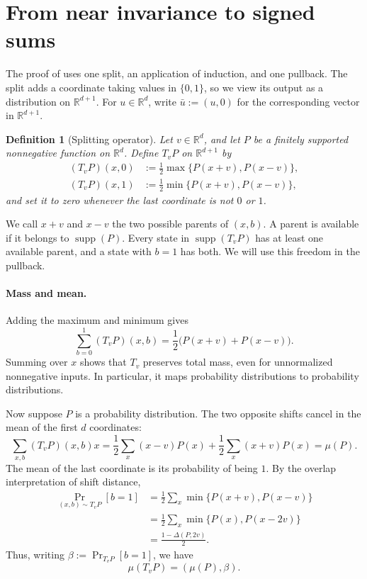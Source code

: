 \documentclass{article}
\newtheorem{definition}[theorem]{Definition}
\newcommand{\R}{\mathbb{R}}
\newcommand{\SDS}[2]{\Delta(#1,#2)}
\newcommand{\supp}{\operatorname{supp}}
\begin{document}
\section{From near invariance to signed sums}
\label{sec:balancing}

The proof of  uses one split, an application
of induction, and one pullback. The split adds a coordinate taking
values in $\{0,1\}$, so we view its output as a distribution on
$\R^{d+1}$. For $u\in\R^d$, write $\bar u:=(u,0)$ for the
corresponding vector in $\R^{d+1}$.

\begin{definition}[Splitting operator]
\label{def:splitting}
Let $v\in\R^d$, and let $P$ be a finitely supported nonnegative
function on $\R^d$. Define $T_vP$ on $\R^{d+1}$ by
\[
\begin{aligned}
(T_vP)(x,0)&:=\frac12\max\{P(x+v),P(x-v)\},\\
(T_vP)(x,1)&:=\frac12\min\{P(x+v),P(x-v)\},
\end{aligned}
\]
and set it to zero whenever the last coordinate is not $0$ or $1$.
\end{definition}

We call $x+v$ and $x-v$ the two possible parents of $(x,b)$.
A parent is available if it belongs to $\supp(P)$. Every state
in $\supp(T_vP)$ has at least one available parent, and a state
with $b=1$ has both. We will use this freedom in the pullback.

\paragraph{Mass and mean.}
Adding the maximum and minimum gives
\begin{equation}
\label{eq:split-sum}
\sum_{b=0}^1(T_vP)(x,b)
=\frac12\bigl(P(x+v)+P(x-v)\bigr).
\end{equation}
Summing over $x$ shows that $T_v$ preserves total mass, even for
unnormalized nonnegative inputs. In particular, it maps probability
distributions to probability distributions.

Now suppose $P$ is a probability distribution. The two opposite
shifts cancel in the mean of the first $d$ coordinates:
\[
\sum_{x,b}(T_vP)(x,b)x
=\frac12\sum_x(x-v)P(x)+\frac12\sum_x(x+v)P(x)
=\mu(P).
\]
The mean of the last coordinate is its probability of being $1$.
By the overlap interpretation of shift distance,
\begin{equation}
\label{eq:one-bit}
\begin{aligned}
\Pr_{(x,b)\sim T_vP}[b=1]
&=\frac12\sum_x\min\{P(x+v),P(x-v)\}\\
&=\frac12\sum_x\min\{P(x),P(x-2v)\}\\
&=\frac{1-\SDS{P}{2v}}2.
\end{aligned}
\end{equation}
Thus, writing $\beta:=\Pr_{T_vP}[b=1]$, we have
\[
\mu(T_vP)=(\mu(P),\beta).
\]
\end{document}
